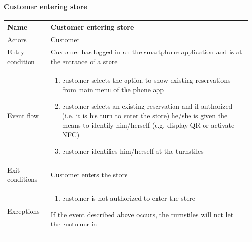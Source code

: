 \paragraph{Customer entering store}
\begin{flushleft}
	\begin{tabular} { | m{3cm} | m{10cm} | }
		\hline
		Name & Customer entering store\\
		\hline
		Actors & Customer\\
		\hline
		Entry condition & Customer has logged in on the smartphone application and is at the entrance of a store\\
		\hline
		Event flow & \begin{enumerate}
			\item customer selects the option to show existing reservations from main menu of the phone app %
			\item customer selects an existing reservation and if authorized (i.e. it is his turn to enter the store) he/she is given the means to identify him/herself (e.g. display QR or activate NFC)
			\item customer identifies him/herself at the turnstiles
		\end{enumerate}\\
		\hline
		Exit conditions & Customer enters the store\\
		\hline
		Exceptions & \begin{enumerate}
			\item customer is not authorized to enter the store
		\end{enumerate}
		If the event described above occurs, the turnstiles will not let the customer in\\
		\hline
	\end{tabular}
\end{flushleft}

